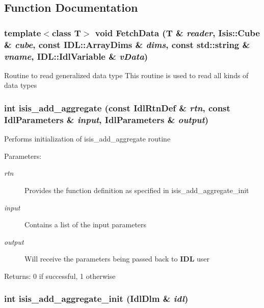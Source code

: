 \subsection{Function Documentation}
\subsubsection{\setlength{\rightskip}{0pt plus 5cm}template$<$class T$>$ void Fetch\-Data (T \& {\em reader}, Isis::Cube \& {\em cube}, const IDL::Array\-Dims \& {\em dims}, const std::string \& {\em vname}, IDL::Idl\-Variable \& {\em v\-Data})}\label{namespaceISISDLM_a5}


Routine to read generalized data type This routine is used to read all kinds of data types 
\subsubsection{\setlength{\rightskip}{0pt plus 5cm}int isis\_\-add\_\-aggregate (const Idl\-Rtn\-Def \& {\em rtn}, const Idl\-Parameters \& {\em input}, Idl\-Parameters \& {\em output})}\label{namespaceISISDLM_a8}


Performs initialization of isis\_\-add\_\-aggregate routine \begin{Desc}
\item[Parameters:]
\begin{description}
\item[{\em rtn}]Provides the function definition as specified in isis\_\-add\_\-aggregate\_\-init \item[{\em input}]Contains a list of the input parameters \item[{\em output}]Will receive the parameters being passed back to {\bf IDL} user \end{description}
\end{Desc}
\begin{Desc}
\item[Returns:]0 if successful, 1 otherwise \end{Desc}
\subsubsection{\setlength{\rightskip}{0pt plus 5cm}int isis\_\-add\_\-aggregate\_\-init (Idl\-Dlm \& {\em idl})}\label{namespaceISISDLM_a7}



